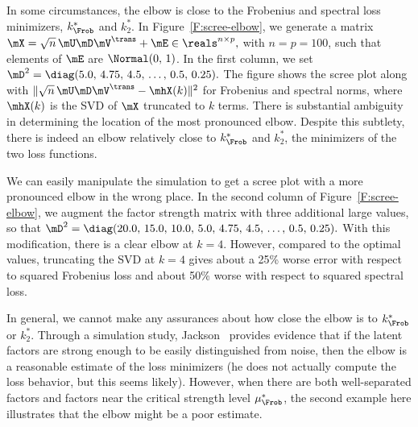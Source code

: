 In some circumstances, the elbow is close to the Frobenius and spectral loss
minimizers, $k_\Frob^\ast$ and $k_2^\ast$. In Figure~\ref{F:scree-elbow}, we
generate a matrix
\(
    \mX = \sqrt{n} \, \mU \mD \mV^\trans + \mE \in \reals^{n \times p},
\)
with $n = p = 100$, such that elements of $\mE$ are \iid $\Normal( 0, \, 1)$. 
In the first column, we set
\(
    \mD^2 = \diag( 5.0, \, 4.75, \, 4.5, \, \ldots, \, 0.5, \, 0.25 ).
\)
The figure shows the scree plot along with
\(
    \| \sqrt{n} \, \mU \mD \mV^\trans - \mhX(k) \|^2
\) 
for Frobenius and spectral norms, where $\mhX(k)$ is the SVD of $\mX$
truncated to $k$ terms. There is substantial ambiguity in determining the
location of the most pronounced elbow. Despite this subtlety, there is indeed 
an elbow relatively close to $k_\Frob^\ast$ and $k_2^\ast$, the minimizers of 
the two loss functions.

We can easily manipulate the simulation to get a scree plot with a more 
pronounced elbow in the wrong place.  In the second column of Figure~\ref{F:scree-elbow}, we augment the factor strength matrix with three additional large values, so that
\(
    \mD^2 
    = 
    \diag( 
        20.0, \, 15.0, \, 10.0, \,
        5.0, \, 4.75, \, 4.5, \, \ldots, \, 0.5, \, 0.25 
    ).
\)
With this modification, there is a clear elbow at $k=4$.  However, compared to 
the optimal values, truncating the SVD at $k=4$ gives about a 25\% worse error 
with respect to squared Frobenius loss and about 50\% worse with respect to 
squared spectral loss.

In general, we cannot make any assurances about how close the elbow is to 
$k_\Frob^\ast$ or $k_2^\ast$.  Through a simulation study, 
Jackson~\cite{jackson1993stopping} provides evidence that if the latent 
factors are strong enough to be easily distinguished from noise, then the 
elbow is a reasonable estimate of the loss minimizers (he does not actually compute the loss behavior, but this seems likely).  However, when there 
are both well-separated factors and factors near the critical strength level 
$\mu_\Frob^\ast$, the second example here illustrates that the elbow might be 
a poor estimate.

